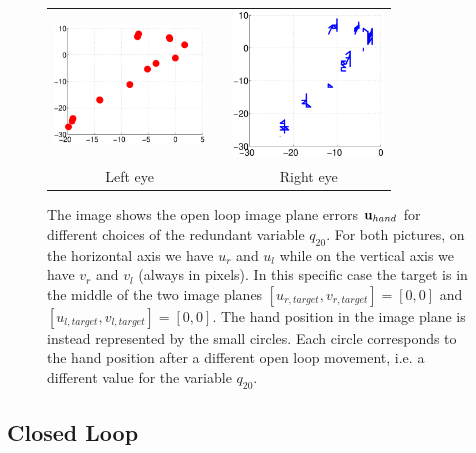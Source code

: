 \begin{figure}
  \begin{center}
	\begin{tabular}{ccc}
	  \parbox{40mm}{\includegraphics[width=40mm]{Figure/LeftEyeOpenLoop.eps}}  & \hspace{2cm} &
	  \parbox{40mm}{\includegraphics[width=40mm]{Figure/RightEyeOpenLoop.eps}}
	  \\
	  \parbox{40mm}{\centering Left eye } & \hspace{2cm} & \parbox{40mm}{\centering Right eye }
  \end{tabular}
\end{center}
\caption{The image shows the open loop image plane errors $\mathbf{u}_{hand}$ for different
choices of the redundant variable $q_{20}$. For both pictures, on the horizontal axis 
we have $u_r$ and $u_l$ while on the vertical axis we have $v_r$ and $v_l$ (always in pixels).
In this specific case the target is in the middle of the two image planes 
$[u_{r, target}, v_{r, target}] =[0,0]$ and $[u_{l, target}, v_{l, target}]=[0,0]$.
The hand position in the image plane is instead represented 
by the small circles.  Each circle corresponds to the hand position 
after a different open loop movement, i.e. a different value for the variable $q_{20}$.
}\label{Fig:ImagePlaneOpenLoopErrors}
  \end{figure}

\subsection{Closed Loop}

